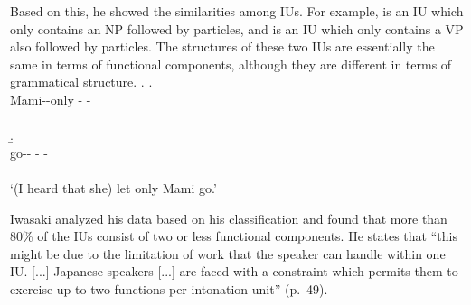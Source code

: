 Based on this,
he showed the similarities among IUs.
For example, 
\Next[a] is an IU which only contains an NP followed by particles, and
\Next[b] is an IU which only contains a VP also followed by particles.
The structures of these two IUs are essentially the same in terms of functional components,
although they are different in terms of grammatical structure.
%
\ex.
 \a.
   \\
        Mami--only - - \\
           \\
 \b.
   \\
         go-- - - \\
            \\
  \glt  `(I heard that she) let only Mami go.'

Iwasaki analyzed his data based on his classification and
found that more than 80\% of the IUs consist of
two or less functional components.
He states that
``this might be due to the limitation of work that the speaker can handle within one IU. [...] Japanese speakers [...] are faced with a constraint which permits them to exercise up to two functions per intonation unit'' (p.~49).


